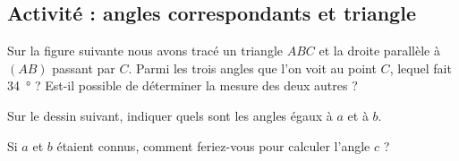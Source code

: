 
\subsection*{Activité : angles correspondants et triangle}

Sur la figure suivante nous avons tracé un triangle \( ABC\) et la droite parallèle à \( (AB)\) passant par \( C\). Parmi les trois angles que l'on voit au point \( C\), lequel fait \SI{34}{\degree} ? Est-il possible de déterminer la mesure des deux autres ?

\begin{center}
   
\end{center}







Sur le dessin suivant, indiquer quels sont les angles égaux à \( a\) et à \( b\). 
\begin{center}
    
\end{center}
Si \( a\) et \( b\) étaient connus, comment feriez-vous pour calculer l'angle \( c\) ?
